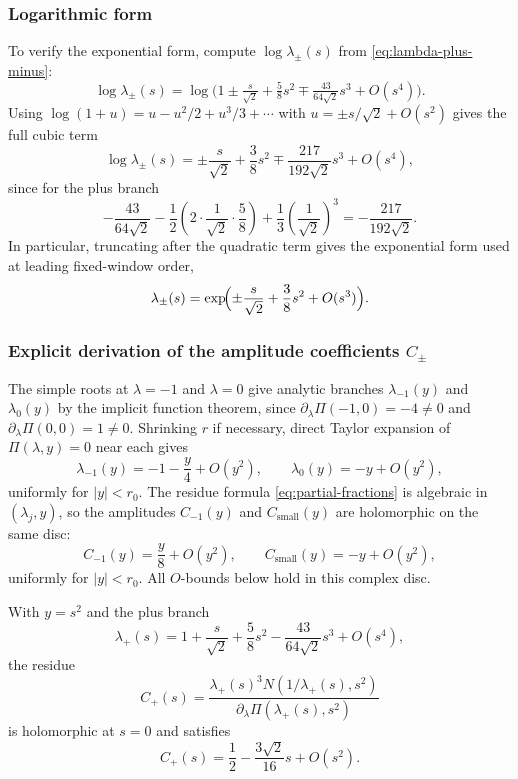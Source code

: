\subsubsection*{Logarithmic form}

To verify the exponential form, compute $\log\lambda_\pm(s)$ from \eqref{eq:lambda-plus-minus}:
\[
\log\lambda_\pm(s)
=\log\bigl(1\pm\tfrac{s}{\sqrt2}+\tfrac58s^2\mp\tfrac{43}{64\sqrt2}s^3+O(s^4)\bigr).
\]
Using $\log(1+u)=u-u^2/2+u^3/3+\cdots$ with $u=\pm s/\sqrt2+O(s^2)$ gives the full cubic term
\[
\log\lambda_\pm(s)=\pm\frac{s}{\sqrt2}+\frac38 s^2\mp\frac{217}{192\sqrt2}s^3+O(s^4),
\]
since for the plus branch
\[
-\frac{43}{64\sqrt2}-\frac{1}{2}\left(2\cdot\frac1{\sqrt2}\cdot\frac58\right)+\frac13\left(\frac1{\sqrt2}\right)^3
=-\frac{217}{192\sqrt2}.
\]
In particular, truncating after the quadratic term gives the exponential form used at leading fixed-window order,
\begin{equation}\label{eq:lambda-pm-exp}
\lambda_\pm(s)=\exp\!\Bigl(\pm\frac{s}{\sqrt2}+\frac38 s^2+O(s^3)\Bigr).
\end{equation}

\subsubsection*{Explicit derivation of the amplitude coefficients \texorpdfstring{$C_\pm$}{C\_pm}}

The simple roots at $\lambda=-1$ and $\lambda=0$ give analytic branches $\lambda_{-1}(y)$ and $\lambda_0(y)$ by the implicit function theorem, since $\partial_\lambda\Pi(-1,0)=-4\neq0$ and $\partial_\lambda\Pi(0,0)=1\neq0$.
Shrinking $r$ if necessary, direct Taylor expansion of $\Pi(\lambda,y)=0$ near each gives
\begin{equation}\label{eq:other-branches}
\lambda_{-1}(y)=-1-\frac{y}{4}+O(y^2),
\qquad
\lambda_0(y)=-y+O(y^2),
\end{equation}
uniformly for $|y|<r_0$.
The residue formula \eqref{eq:partial-fractions} is algebraic in $(\lambda_j,y)$, so the amplitudes $C_{-1}(y)$ and $C_{\mathrm{small}}(y)$ are holomorphic on the same disc:
\begin{equation}\label{eq:other-amplitudes}
C_{-1}(y)=\frac{y}{8}+O(y^2),
\qquad
C_{\mathrm{small}}(y)=-y+O(y^2),
\end{equation}
uniformly for $|y|<r_0$.
All $O$-bounds below hold in this complex disc.

\begin{lemma}\label{lem:plus-branch-residue-cancellation}
With $y=s^2$ and the plus branch
\[
\lambda_+(s)=1+\frac{s}{\sqrt2}+\frac58s^2-\frac{43}{64\sqrt2}s^3+O(s^4),
\]
the residue
\[
C_+(s)=
\frac{\lambda_+(s)^3N(1/\lambda_+(s),s^2)}
{\partial_\lambda\Pi(\lambda_+(s),s^2)}
\]
is holomorphic at $s=0$ and satisfies
\[
C_+(s)=\frac12-\frac{3\sqrt2}{16}s+O(s^2).
\]
\end{lemma}

